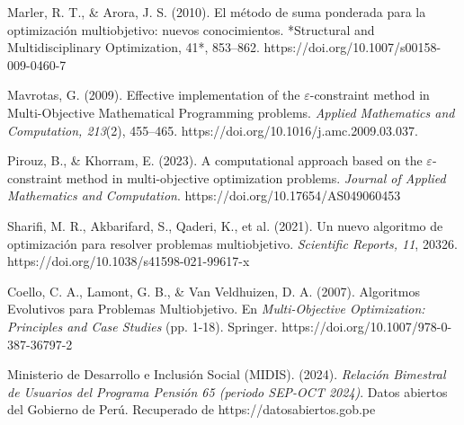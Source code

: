 \documentclass[12pt]{article}
\begin{document}
\begin{thebibliography}{99}
	Marler, R. T., \& Arora, J. S. (2010). El método de suma ponderada para la optimización multiobjetivo: nuevos conocimientos. *Structural and Multidisciplinary Optimization, 41*, 853–862. https://doi.org/10.1007/s00158-009-0460-7
	
	Mavrotas, G. (2009). Effective implementation of the $\varepsilon$-constraint method in Multi-Objective Mathematical Programming problems. \textit{Applied Mathematics and Computation, 213}(2), 455–465. https://doi.org/10.1016/j.amc.2009.03.037.
	
	Pirouz, B., \& Khorram, E. (2023). A computational approach based on the $\varepsilon$-constraint method in multi-objective optimization problems. \textit{Journal of Applied Mathematics and Computation}. https://doi.org/10.17654/AS049060453
	
	Sharifi, M. R., Akbarifard, S., Qaderi, K., et al. (2021). Un nuevo algoritmo de optimización para resolver problemas multiobjetivo. \textit{Scientific Reports, 11}, 20326. 
	https://doi.org/10.1038/s41598-021-99617-x
	
	Coello, C. A., Lamont, G. B., \& Van Veldhuizen, D. A. (2007). Algoritmos Evolutivos para Problemas Multiobjetivo. En \textit{Multi-Objective Optimization: Principles and Case Studies} (pp. 1-18). Springer. https://doi.org/10.1007/978-0-387-36797-2
	
	Ministerio de Desarrollo e Inclusión Social (MIDIS). (2024). \textit{Relación Bimestral de Usuarios del Programa Pensión 65 (periodo SEP-OCT 2024)}. Datos abiertos del Gobierno de Perú. Recuperado de https://datosabiertos.gob.pe
	
\end{thebibliography}
\end{document}
